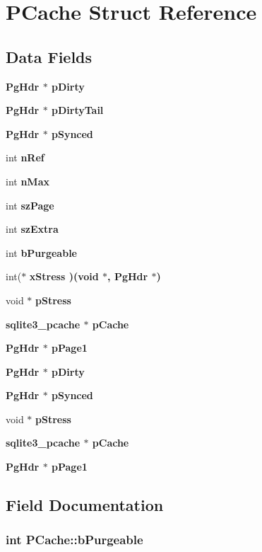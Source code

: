 \section{PCache Struct Reference}
\label{structPCache}
\subsection*{Data Fields}
\begin{CompactItemize}
\item 
\bf{Pg\-Hdr} $\ast$ \bf{p\-Dirty}
\item 
\bf{Pg\-Hdr} $\ast$ \bf{p\-Dirty\-Tail}
\item 
\bf{Pg\-Hdr} $\ast$ \bf{p\-Synced}
\item 
int \bf{n\-Ref}
\item 
int \bf{n\-Max}
\item 
int \bf{sz\-Page}
\item 
int \bf{sz\-Extra}
\item 
int \bf{b\-Purgeable}
\item 
int($\ast$ \bf{x\-Stress} )(void $\ast$, \bf{Pg\-Hdr} $\ast$)
\item 
void $\ast$ \bf{p\-Stress}
\item 
\bf{sqlite3\_\-pcache} $\ast$ \bf{p\-Cache}
\item 
\bf{Pg\-Hdr} $\ast$ \bf{p\-Page1}
\item 
\bf{Pg\-Hdr} $\ast$ \bf{p\-Dirty}
\item 
\bf{Pg\-Hdr} $\ast$ \bf{p\-Synced}
\item 
void $\ast$ \bf{p\-Stress}
\item 
\bf{sqlite3\_\-pcache} $\ast$ \bf{p\-Cache}
\item 
\bf{Pg\-Hdr} $\ast$ \bf{p\-Page1}
\end{CompactItemize}


\subsection{Field Documentation}
\subsubsection{\setlength{\rightskip}{0pt plus 5cm}int \bf{PCache::b\-Purgeable}}\label{structPCache_c538b97b0f7eb5905456d641b4e0d5b9}


